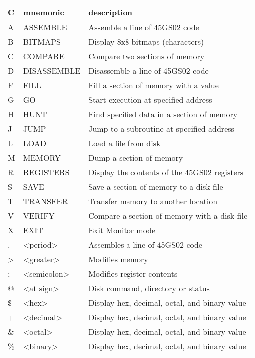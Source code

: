{
\ttfamily
\setlength{\tabcolsep}{1mm}
\begin{center}
\begin{tabular}{|l|l|l|}
\hline
C & mnemonic & description \\
\hline
A &     ASSEMBLE        & Assemble a line of 45GS02 code\\
B &     BITMAPS         & Display 8x8 bitmaps (characters)\\
C &     COMPARE         & Compare two sections of memory\\
D &     DISASSEMBLE     & Disassemble a line of 45GS02 code\\
F &     FILL            & Fill a section of memory with a value \\
G &     GO              & Start execution at specified address\\
H &     HUNT            & Find specified data in a section of memory\\
J &     JUMP            & Jump to a subroutine at specified address\\
L &     LOAD            & Load a file from disk\\
M &     MEMORY          & Dump a section of memory\\
R &     REGISTERS       & Display the contents of the 45GS02 registers\\
S &     SAVE            & Save a section of memory to a disk file\\
T &     TRANSFER        & Transfer memory to another location\\
V &     VERIFY          & Compare a section of memory with a disk file\\
X &     EXIT            & Exit Monitor mode\\
\hline
 . &     <period>        & Assembles a line of 45GS02 code\\
 > &     <greater>       & Modifies memory\\
 ; &     <semicolon>     & Modifies register contents\\
 @ &     <at sign>       & Disk command, directory or status\\
\hline
\$ &     <hex>           & Display hex, decimal, octal, and binary value \\
 + &     <decimal>       & Display hex, decimal, octal, and binary value\\
\& &     <octal>         & Display hex, decimal, octal, and binary value\\
\% &     <binary>        & Display hex, decimal, octal, and binary value\\
\hline
\end{tabular}
\end{center}
}

